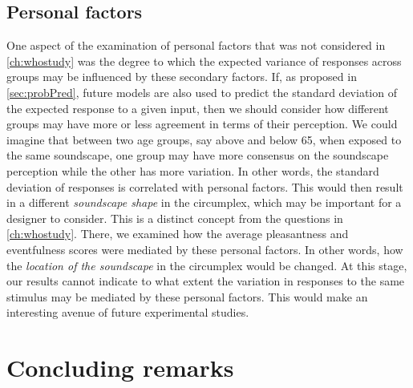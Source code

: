 \subsection{Personal factors}
One aspect of the examination of personal factors that was not considered in \cref{ch:whostudy} was the degree to which the expected variance of responses across groups may be influenced by these secondary factors. If, as proposed in \cref{sec:probPred}, future models are also used to predict the standard deviation of the expected response to a given input, then we should consider how different groups may have more or less agreement in terms of their perception. We could imagine that between two age groups, say above and below 65, when exposed to the same soundscape, one group may have more consensus on the soundscape perception while the other has more variation. In other words, the standard deviation of responses is correlated with personal factors. This would then result in a different \emph{soundscape shape} in the circumplex, which may be important for a designer to consider. This is a distinct concept from the questions in \cref{ch:whostudy}. There, we examined how the average pleasantness and eventfulness scores were mediated by these personal factors. In other words, how the \emph{location of the soundscape} in the circumplex would be changed. At this stage, our results cannot indicate to what extent the variation in responses to the same stimulus may be mediated by these personal factors. This would make an interesting avenue of future experimental studies.

\section{Concluding remarks}

